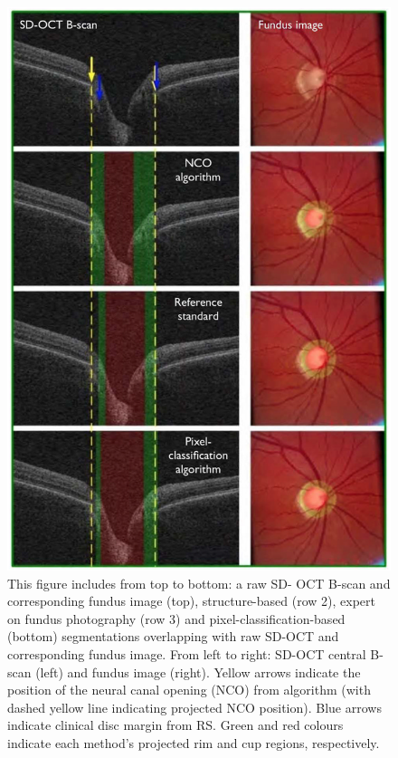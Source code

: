 \begin{figure}[htbp]
\centering
\includegraphics{figures/morgan_6}
\caption{This figure includes from top to bottom: a raw SD- OCT B-scan and corresponding
fundus image (top), structure-based (row 2), expert on fundus photography (row 3) and
pixel-classification-based (bottom) segmentations overlapping with raw SD-OCT and
corresponding fundus image.  From left to right: SD-OCT central B- scan (left) and
fundus image (right).  Yellow arrows indicate the position of the neural canal opening
(NCO) from algorithm (with dashed yellow line indicating projected NCO position).
Blue arrows indicate clinical disc margin from RS. Green and red colours indicate each
method’s projected rim and cup regions, respectively. \cite{mbib_4} }
\label{fig:m_6}
\end{figure}

